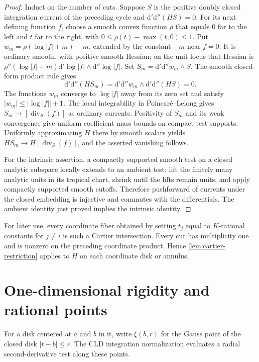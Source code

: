 \documentclass[11pt,a4paper]{amsart}
\begin{document}
\begin{proof}
Induct on the number of cuts. Suppose $S$ is the positive doubly closed integration current of the preceding cycle and $\mathrm d'\mathrm d''(HS)=0$. For its next defining function $f$, choose a smooth convex function $\rho$ that equals $0$ far to the left and $t$ far to the right, with $0\leq\rho(t)-\max(t,0)\leq1$. Put $w_m=\rho(\log|f|+m)-m$, extended by the constant $-m$ near $f=0$. It is ordinary smooth, with positive smooth Hessian; on the unit locus that Hessian is $\rho''(\log|f|+m)\mathrm d'\log|f|\wedge\mathrm d''\log|f|$. Set $S_m=\mathrm d'\mathrm d''w_m\wedge S$. The smooth closed-form product rule gives
\[
 \mathrm d'\mathrm d''(HS_m)=\mathrm d'\mathrm d''w_m\wedge\mathrm d'\mathrm d''(HS)=0.
\]
The functions $w_m$ converge to $\log|f|$ away from its zero set and satisfy $|w_m|\leq|\log|f||+1$. The local integrability in Poincar\'e--Lelong gives $S_m\to[\operatorname{div}_S(f)]$ as ordinary currents. Positivity of $S_m$ and its weak convergence give uniform coefficient-mass bounds on compact test supports. Uniformly approximating $H$ there by smooth scalars yields $HS_m\to H[\operatorname{div}_S(f)]$, and the asserted vanishing follows.

For the intrinsic assertion, a compactly supported smooth test on a closed analytic subspace locally extends to an ambient test: lift the finitely many analytic units in its tropical chart, shrink until the lifts remain units, and apply compactly supported smooth cutoffs. Therefore pushforward of currents under the closed embedding is injective and commutes with the differentials. The ambient identity just proved implies the intrinsic identity.
\end{proof}

For later use, every coordinate fiber obtained by setting $t_j$ equal to $K$-rational constants for $j\neq i$ is such a Cartier intersection. Every cut has multiplicity one and is nonzero on the preceding coordinate product. Hence \cref{lem:cartier-restriction} applies to $H$ on each coordinate disk or annulus.

\section{One-dimensional rigidity and rational points}\label{sec:curves}

For a disk centered at $a$ and $b$ in it, write $\xi(b,r)$ for the Gauss point of the closed disk $|t-b|\leq r$. The CLD integration normalization evaluates a radial second-derivative test along these points.
\end{document}
